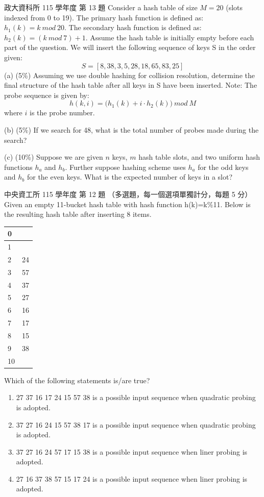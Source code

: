 \begin{pastexam}[label={px:hash-2}]{政大資科所 115 學年度 第 13 題}
Consider a hash table of size $M=20$ (slots indexed from 0 to 19). The primary hash function is defined as: $h_1(k)=k \mathit{\ mod\ } 20$. The secondary hash function is defined as: $h_2(k)=(k \mathit{\ mod\ } 7)+1$. Assume the hash table is initially empty before each part of the question. We will insert the following sequence of keys S in the order given:
\[ S=[8,38,3,5,28,18,65,83,25] \]
(a) (5\%) Assuming we use double hashing for collision resolution, determine the final structure of the hash table after all keys in S have been inserted. Note: The probe sequence is given by:
\[ h(k,i)=\big(h_1(k)+i\cdot h_2(k)\big) \mathit{\ mod\ } M \]
where $i$ is the probe number.

(b) (5\%) If we search for 48, what is the total number of probes made during the search?

(c) (10\%) Suppose we are given $n$ keys, $m$ hash table slots, and two uniform hash functions $h_a$ and $h_b$. Further suppose hashing scheme uses $h_a$ for the odd keys and $h_b$ for the even keys. What is the expected number of keys in a slot?
\end{pastexam}

\begin{pastexam}[label={px:hash-3}]{中央資工所 115 學年度 第 12 題}
（多選題，每一個選項單獨計分，每題 5 分）
Given an empty 11-bucket hash table with hash function h(k)=k\%11. Below is the resulting hash table after inserting 8 items.
\begin{center}
\begin{tabular}{|l|l|}
\hline
0 & \\ \hline
1 & \\ \hline
2 & 24 \\ \hline
3 & 57 \\ \hline
4 & 37 \\ \hline
5 & 27 \\ \hline
6 & 16 \\ \hline
7 & 17 \\ \hline
8 & 15 \\ \hline
9 & 38 \\ \hline
10 & \\ \hline
\end{tabular}
\end{center}
Which of the following statements is/are true?
\begin{enumerate}[label=\Alph*.]
\item 27 37 16 17 24 15 57 38 is a possible input sequence when quadratic probing is adopted.
\item 37 27 16 24 15 57 38 17 is a possible input sequence when quadratic probing is adopted.
\item 37 27 16 24 57 17 15 38 is a possible input sequence when liner probing is adopted.
\item 27 16 37 38 57 15 17 24 is a possible input sequence when liner probing is adopted.
\end{enumerate}
\end{pastexam}

